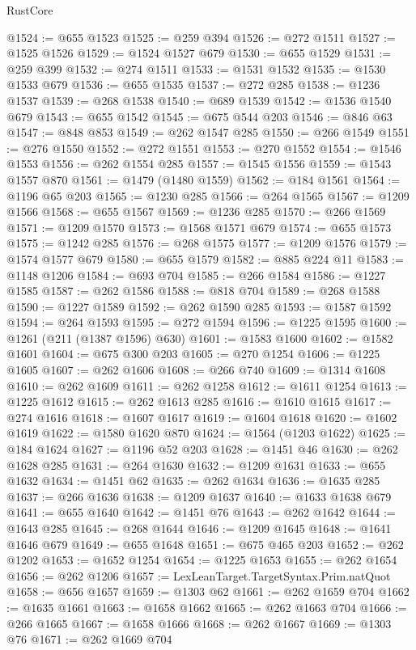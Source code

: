 \begin{lexlean}{RustCore}
\begin{coremodule}
@1524 := @655 @1523
@1525 := @259 @394
@1526 := @272 @1511
@1527 := @1525 @1526
@1529 := @1524 @1527 @679
@1530 := @655 @1529
@1531 := @259 @399
@1532 := @274 @1511
@1533 := @1531 @1532
@1535 := @1530 @1533 @679
@1536 := @655 @1535
@1537 := @272 @285
@1538 := @1236 @1537
@1539 := @268 @1538
@1540 := @689 @1539
@1542 := @1536 @1540 @679
@1543 := @655 @1542
@1545 := @675 @544 @203
@1546 := @846 @63
@1547 := @848 @853
@1549 := @262 @1547 @285
@1550 := @266 @1549
@1551 := @276 @1550
@1552 := @272 @1551
@1553 := @270 @1552
@1554 := @1546 @1553
@1556 := @262 @1554 @285
@1557 := @1545 @1556
@1559 := @1543 @1557 @870
@1561 := @1479 (@1480 @1559)
@1562 := @184 @1561
@1564 := @1196 @65 @203
@1565 := @1230 @285
@1566 := @264 @1565
@1567 := @1209 @1566
@1568 := @655 @1567
@1569 := @1236 @285
@1570 := @266 @1569
@1571 := @1209 @1570
@1573 := @1568 @1571 @679
@1574 := @655 @1573
@1575 := @1242 @285
@1576 := @268 @1575
@1577 := @1209 @1576
@1579 := @1574 @1577 @679
@1580 := @655 @1579
@1582 := @885 @224 @11
@1583 := @1148 @1206
@1584 := @693 @704
@1585 := @266 @1584
@1586 := @1227 @1585
@1587 := @262 @1586
@1588 := @818 @704
@1589 := @268 @1588
@1590 := @1227 @1589
@1592 := @262 @1590 @285
@1593 := @1587 @1592
@1594 := @264 @1593
@1595 := @272 @1594
@1596 := @1225 @1595
@1600 := @1261 (@211 (@1387 @1596) @630)
@1601 := @1583 @1600
@1602 := @1582 @1601
@1604 := @675 @300 @203
@1605 := @270 @1254
@1606 := @1225 @1605
@1607 := @262 @1606
@1608 := @266 @740
@1609 := @1314 @1608
@1610 := @262 @1609
@1611 := @262 @1258
@1612 := @1611 @1254
@1613 := @1225 @1612
@1615 := @262 @1613 @285
@1616 := @1610 @1615
@1617 := @274 @1616
@1618 := @1607 @1617
@1619 := @1604 @1618
@1620 := @1602 @1619
@1622 := @1580 @1620 @870
@1624 := @1564 (@1203 @1622)
@1625 := @184 @1624
@1627 := @1196 @52 @203
@1628 := @1451 @46
@1630 := @262 @1628 @285
@1631 := @264 @1630
@1632 := @1209 @1631
@1633 := @655 @1632
@1634 := @1451 @62
@1635 := @262 @1634
@1636 := @1635 @285
@1637 := @266 @1636
@1638 := @1209 @1637
@1640 := @1633 @1638 @679
@1641 := @655 @1640
@1642 := @1451 @76
@1643 := @262 @1642
@1644 := @1643 @285
@1645 := @268 @1644
@1646 := @1209 @1645
@1648 := @1641 @1646 @679
@1649 := @655 @1648
@1651 := @675 @465 @203
@1652 := @262 @1202
@1653 := @1652 @1254
@1654 := @1225 @1653
@1655 := @262 @1654
@1656 := @262 @1206
@1657 := LexLeanTarget.TargetSyntax.Prim.natQuot
@1658 := @656 @1657
@1659 := @1303 @62
@1661 := @262 @1659 @704
@1662 := @1635 @1661
@1663 := @1658 @1662
@1665 := @262 @1663 @704
@1666 := @266 @1665
@1667 := @1658 @1666
@1668 := @262 @1667
@1669 := @1303 @76
@1671 := @262 @1669 @704

\end{coremodule}
\end{lexlean}
